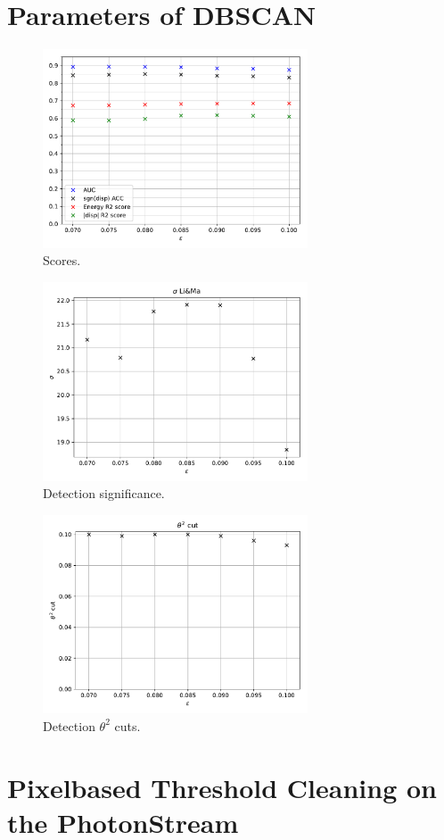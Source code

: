 \section{Parameters of DBSCAN}
%
\begin{figure}
  \centering
  \includegraphics[width=0.7\textwidth]{Plots/Epsilon/eps_scores.pdf}
  \caption{Scores.}
  \label{fig:eps_scores}
\end{figure}
%
\begin{figure}
  \centering
  \includegraphics[width=0.7\textwidth]{Plots/Epsilon/eps_sigma.pdf}
  \caption{Detection significance.}
  \label{fig:eps_sigma}
\end{figure}
%
\begin{figure}
  \centering
  \includegraphics[width=0.7\textwidth]{Plots/Epsilon/eps_theta_cut.pdf}
  \caption{Detection $\theta^2$ cuts.}
  \label{fig:eps_sigma}
\end{figure}

\section{Pixelbased Threshold Cleaning on the PhotonStream}
%
